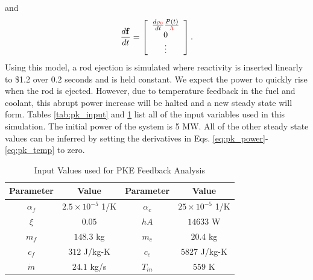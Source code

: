 \documentclass{ansconf}
\numberwithin{equation}{section}
\begin{document}
and
  \begin{equation}
     \frac{d\mathbf{f}}{dt} = \left[\begin{array}{c}
                        \frac{d\color{red}\rho_0}{dt}\frac{P\left(t\right)}{\color{red}\Lambda} \\
                        0 \\
                        \vdots
                      \end{array}\right].
  \end{equation}
Using this model, a rod ejection is simulated where reactivity is inserted linearly to \$1.2 over 0.2 seconds and is held constant. We expect the power to quickly rise when the rod is ejected. However, due to temperature feedback in the fuel and coolant, this abrupt power increase will be halted and a new steady state will form. Tables \ref{tab:pk_input} and \ref{tab:pk_feedback_input} list all of the input variables used in this simulation. The initial power of the system is 5 MW. All of the other steady state values can be inferred by setting the derivatives in Eqs. \eqref{eq:pk_power}-\eqref{eq:pk_temp} to zero.
\begin{table}
\caption{Input Values used for PKE Feedback Analysis}
\label{tab:pk_feedback_input}
\centering
\begin{tabular}{cc||cc}
\toprule 
Parameter & Value & Parameter & Value\tabularnewline
\midrule
\midrule 
$\alpha_f$ & $2.5\times 10^{-5}$ 1/K & $\alpha_c$ & $25\times 10^{-5}$ 1/K \tabularnewline
\midrule 
$\xi$ & $0.05$ & $hA$ & $14633$ W \tabularnewline
\midrule 
$m_f$ & $148.3$ kg & $m_c$ & $20.4$ kg \tabularnewline
\midrule 
$c_f$ & $312$ J/kg-K & $c_c$ & $5827$ J/kg-K \tabularnewline
\midrule 
$\dot{m}$ & $24.1$ kg/s & $T_{in}$ & $559$ K \tabularnewline
\bottomrule
\end{tabular}
\end{table}
\end{document}
